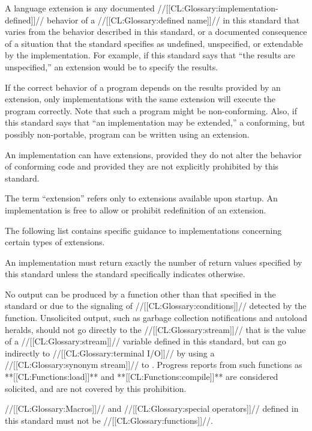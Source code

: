 

  A language extension is any documented //[[CL:Glossary:implementation-defined]]// behavior of a //[[CL:Glossary:defined name]]// in this standard that varies from the behavior described in this standard, or a documented consequence of a situation that the standard specifies as undefined, unspecified, or extendable by the implementation.  For example, if this standard says that ``the results are unspecified,'' an extension would be to specify the results.

 If the correct behavior of a program depends on the results provided by an extension, only implementations with the same extension will execute the program correctly.  Note that such a program might be non-conforming.  Also, if this standard says that ``an implementation may be extended,'' a conforming, but possibly non-portable, program can be written using an extension.

An implementation can have extensions, provided they do not alter the behavior of conforming code and provided they are not explicitly prohibited by this standard.

           The term ``extension'' refers only to extensions available upon startup.  An implementation is free to allow or prohibit redefinition of an extension.

The following list contains specific guidance to implementations  concerning certain types of extensions. \beginlist

 


  An implementation must return exactly the number of return values specified by this standard unless the standard specifically indicates otherwise.


  No output can be produced by a function other than that specified in the standard or due to the signaling of //[[CL:Glossary:conditions]]// detected by the function.
  Unsolicited output, such as garbage collection notifications and autoload heralds, should not go directly to the //[[CL:Glossary:stream]]// that is the value of a //[[CL:Glossary:stream]]// variable defined in this standard, but can go indirectly to //[[CL:Glossary:terminal I/O]]// by using a //[[CL:Glossary:synonym stream]]// to .
  Progress reports from such functions as **[[CL:Functions:load]]** and **[[CL:Functions:compile]]** are considered solicited, and are not covered by this prohibition.



//[[CL:Glossary:Macros]]// and //[[CL:Glossary:special operators]]// defined in this standard must not be //[[CL:Glossary:functions]]//.

\endlist
